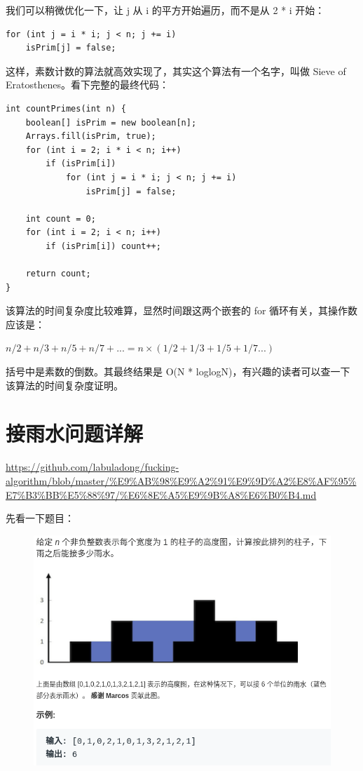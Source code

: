 \documentclass[12pt]{article}
\begin{document}
我们可以稍微优化一下，让 j 从 i 的平方开始遍历，而不是从 2 * i 开始：
\begin{lstlisting}
for (int j = i * i; j < n; j += i) 
    isPrim[j] = false;
\end{lstlisting}

这样，素数计数的算法就高效实现了，其实这个算法有一个名字，叫做 Sieve of Eratosthenes。看下完整的最终代码：
\begin{lstlisting}
int countPrimes(int n) {
    boolean[] isPrim = new boolean[n];
    Arrays.fill(isPrim, true);
    for (int i = 2; i * i < n; i++) 
        if (isPrim[i]) 
            for (int j = i * i; j < n; j += i) 
                isPrim[j] = false;
    
    int count = 0;
    for (int i = 2; i < n; i++)
        if (isPrim[i]) count++;
    
    return count;
}
\end{lstlisting}

该算法的时间复杂度比较难算，显然时间跟这两个嵌套的 for 循环有关，其操作数应该是：

$n/2 + n/3 + n/5 + n/7 + ... = n \times (1/2 + 1/3 + 1/5 + 1/7...)$

括号中是素数的倒数。其最终结果是 O(N * loglogN)，有兴趣的读者可以查一下该算法的时间复杂度证明。

\section{接雨水问题详解}
\url{https://github.com/labuladong/fucking-algorithm/blob/master/%E9%AB%98%E9%A2%91%E9%9D%A2%E8%AF%95%E7%B3%BB%E5%88%97/%E6%8E%A5%E9%9B%A8%E6%B0%B4.md}

先看一下题目：
\begin{figure}[H]
    \centering
    \includegraphics[width=.8\textwidth]{fig/Receive_Rainwater_1.png}
\end{figure}
\end{document}
